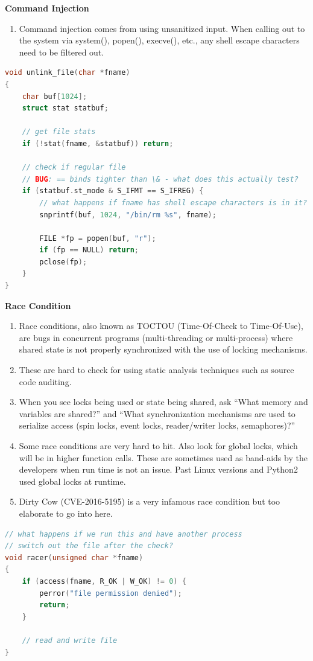 \documentclass[12pt]{Training}
\begin{document}
\textbf{Command Injection}
\begin{enumerate}
    \item Command injection comes from using unsanitized input. When calling out to the system via system(), popen(), execve(), etc., any shell escape characters need to be filtered out.
\end{enumerate}
\begin{sectionbox}
\begin{lstlisting}[language=C, caption={Command Injection}]
void unlink_file(char *fname)
{
    char buf[1024];
    struct stat statbuf;

    // get file stats
    if (!stat(fname, &statbuf)) return;

    // check if regular file
    // BUG: == binds tighter than \& - what does this actually test?
    if (statbuf.st_mode & S_IFMT == S_IFREG) {
        // what happens if fname has shell escape characters is in it?
        snprintf(buf, 1024, "/bin/rm %s", fname);

        FILE *fp = popen(buf, "r");
        if (fp == NULL) return;
        pclose(fp);
    }
}
\end{lstlisting}
\end{sectionbox}

\textbf{Race Condition}
\begin{enumerate}
    \item Race conditions, also known as TOCTOU (Time-Of-Check to Time-Of-Use), are bugs in concurrent programs (multi-threading or multi-process) where shared state is not properly synchronized with the use of locking mechanisms.
    \item These are hard to check for using static analysis techniques such as source code auditing.
    \item When you see locks being used or state being shared, ask ``What memory and variables are shared?'' and ``What synchronization mechanisms are used to serialize access (spin locks, event locks, reader/writer locks, semaphores)?''
    \item Some race conditions are very hard to hit. Also look for global locks, which will be in higher function calls. These are sometimes used as band-aids by the developers when run time is not an issue. Past Linux versions and Python2 used global locks at runtime.
    \item Dirty Cow (CVE-2016-5195) is a very infamous race condition but too elaborate to go into here.
\end{enumerate}
\begin{sectionbox}
\begin{lstlisting}[language=C, caption={Race Condition}]
// what happens if we run this and have another process
// switch out the file after the check?
void racer(unsigned char *fname)
{
    if (access(fname, R_OK | W_OK) != 0) {
        perror("file permission denied");
        return;
    }

    // read and write file
}
\end{lstlisting}
\end{sectionbox}
\end{document}

